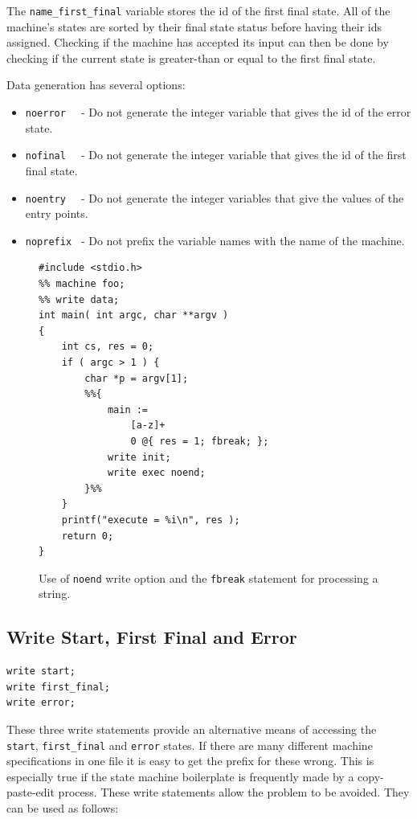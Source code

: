 \documentclass[letterpaper,11pt,oneside]{book}
\newcommand{\verbspace}{\vspace{10pt}}
\begin{document}
The \verb|name_first_final| variable stores the id of the first final state. All of the
machine's states are sorted by their final state status before having their ids
assigned. Checking if the machine has accepted its input can then be done by
checking if the current state is greater-than or equal to the first final
state.

Data generation has several options:

\begin{itemize}
\setlength{\itemsep}{-2mm}
\item \verb|noerror  | - Do not generate the integer variable that gives the
id of the error state.
\item \verb|nofinal  | - Do not generate the integer variable that gives the
id of the first final state.
\item \verb|noentry  | - Do not generate the integer variables that give the
values of the entry points.
\item \verb|noprefix | - Do not prefix the variable names with the name of the
machine.
\end{itemize}

\begin{figure}
\small
\begin{verbatim}
#include <stdio.h>
%% machine foo;
%% write data;
int main( int argc, char **argv )
{
    int cs, res = 0;
    if ( argc > 1 ) {
        char *p = argv[1];
        %%{ 
            main := 
                [a-z]+ 
                0 @{ res = 1; fbreak; };
            write init;
            write exec noend;
        }%%
    }
    printf("execute = %i\n", res );
    return 0;
}
\end{verbatim}
\caption{Use of {\tt noend} write option and the {\tt fbreak} statement for
processing a string.}
\label{fbreak-example}
\end{figure}

\subsection{Write Start, First Final and Error}

\begin{verbatim}
write start;
write first_final;
write error;
\end{verbatim}
\verbspace

These three write statements provide an alternative means of accessing the
\verb|start|, \verb|first_final| and \verb|error| states. If there are many
different machine specifications in one file it is easy to get the prefix for
these wrong. This is especially true if the state machine boilerplate is
frequently made by a copy-paste-edit process. These write statements allow the
problem to be avoided. They can be used as follows:
\end{document}
